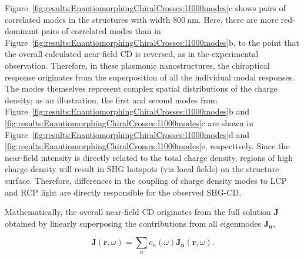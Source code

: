 Figure~\ref{fig:results:EnantiomorphingChiralCrosses:l1000modes}c shows pairs of correlated modes in the structures with width $\SI{800}{\nano\m}$. Here, there are more red-dominant pairs of correlated modes than in Figure~\ref{fig:results:EnantiomorphingChiralCrosses:l1000modes}b, to the point that the overall calculated near-field CD is reversed, as in the experimental observation. Therefore, in these plasmonic nanostructures, the chiroptical response originates from the superposition of all the individual modal responses. 
The modes themselves represent complex spatial distributions of the charge density; as an illustration, the first and second modes from Figure~\ref{fig:results:EnantiomorphingChiralCrosses:l1000modes}b and \ref{fig:results:EnantiomorphingChiralCrosses:l1000modes}c are shown in Figure~\ref{fig:results:EnantiomorphingChiralCrosses:l1000modes}d and \ref{fig:results:EnantiomorphingChiralCrosses:l1000modes}e, respectively.
Since the near-field intensity is directly related to the total charge density, regions of high charge density will result in SHG hotspots (via local fields) on the structure surface. Therefore, differences in the coupling of charge density modes to LCP and RCP light are directly responsible for the observed SHG-CD.

Mathematically, the overall near-field CD originates from the full solution $\mathbf{J}$ obtained by linearly superposing the contributions from all eigenmodes $\mathbf{J_n}$, 

\begin{equation}\label{eq:background:ChiropticalEffects:totalSolution}	
	\mathbf{J} (\mathbf{r}, \omega) = \sum \limits_{n} c_{n}(\omega) \mathbf{J_{n}}(\mathbf{r}, \omega).
\end{equation}

